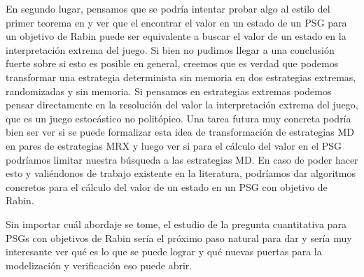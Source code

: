 En segundo lugar, pensamos que se podría intentar probar algo al estilo del
primer teorema en \cite{Polytopal} y ver que el encontrar el valor en un estado
de un PSG para un objetivo de Rabin puede ser equivalente a buscar el valor de
un estado en la interpretación extrema del juego. Si bien no pudimos llegar a
una conclusión fuerte sobre si esto es posible en general, creemos que es
verdad que podemos transformar una estrategia determinista sin memoria en dos
estrategias extremas, randomizadas y sin memoria. Si pensamos en estrategias
extremas podemos pensar directamente en la resolución del valor la
interpretación extrema del juego, que es un juego estocástico no politópico.
Una tarea futura muy concreta podría bien ser ver si se puede formalizar esta
idea de transformación de estrategias MD en pares de estrategias MRX y luego
ver si para el cálculo del valor en el PSG podríamos limitar nuestra búsqueda a
las estrategias MD. En caso de poder hacer esto y valiéndonos de trabajo
existente en la literatura, podríamos dar algoritmos concretos para el cálculo
del valor de un estado en un PSG con objetivo de Rabin.

Sin importar cuál abordaje se tome, el estudio de la pregunta cuantitativa para
PSGs con objetivos de Rabin sería el próximo paso natural para dar y sería muy
interesante ver qué es lo que se puede lograr y qué nuevas puertas para la
modelización y verificación eso puede abrir.
